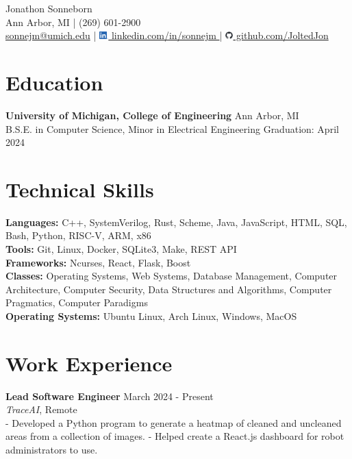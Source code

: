 \documentclass[9pt]{extarticle}
\begin{document}
\begin{center}
  {\Huge Jonathon Sonneborn} \\
  \vspace{2pt}
  Ann Arbor, MI \quad | \quad (269) 601-2900 \\
  \small \href{mailto:sonnejm@umich.edu}{sonnejm@umich.edu} \quad | \quad
  \href{https://www.linkedin.com/in/sonnejm/}{
    \includegraphics[height=0.3cm]{images/LI-In-Bug.png}
    linkedin.com/in/sonnejm
  } \quad | \quad
  \href{https://github.com/joltedjon}{
    \includegraphics[height=0.3cm]{images/github-mark.png}
    github.com/JoltedJon
  } \\
  \vspace{6pt}
\end{center}

\section*{Education}
\textbf{University of Michigan, College of Engineering} \hfill Ann Arbor, MI \\
B.S.E. in Computer Science, Minor in Electrical Engineering \hfill Graduation: April 2024

\section*{Technical Skills}
\textbf{Languages:} C++, SystemVerilog, Rust, Scheme, Java, JavaScript, HTML, SQL, Bash, Python, RISC-V, ARM, x86 \\
\textbf{Tools:} Git, Linux, Docker, SQLite3, Make, REST API \\
\textbf{Frameworks:} Ncurses, React, Flask, Boost \\
\textbf{Classes:} Operating Systems, Web Systems, Database Management, Computer Architecture, Computer Security, Data Structures and Algorithms, Computer Pragmatics, Computer Paradigms\\
\textbf{Operating Systems:} Ubuntu Linux, Arch Linux, Windows, MacOS

\section*{Work Experience}
\textbf{Lead Software Engineer} \hfill March 2024 - Present \\
\textit{TraceAI}, Remote \\
- Developed a Python program to generate a heatmap of cleaned and uncleaned areas from a collection of images.
- Helped create a React.js dashboard for robot administrators to use.
\end{document}
